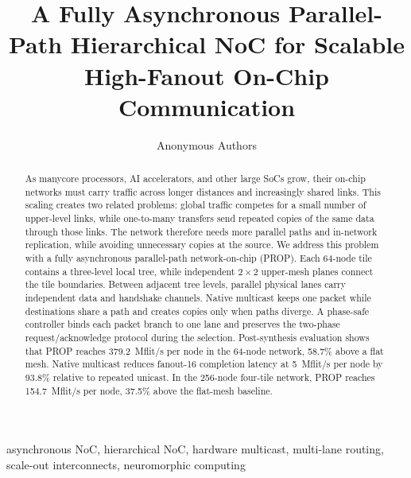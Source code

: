 \documentclass[conference]{IEEEtran}
\begin{document}
\setlength{\textfloatsep}{8pt}
\setlength{\dbltextfloatsep}{8pt}
\setlength{\floatsep}{6pt}
\setlength{\dblfloatsep}{6pt}

\title{A Fully Asynchronous Parallel-Path Hierarchical NoC for Scalable High-Fanout On-Chip Communication}

\author{Anonymous Authors}

\maketitle
\vspace{-3em}

\begin{abstract}
As manycore processors, AI accelerators, and other large SoCs grow, their on-chip networks must carry traffic across longer distances and increasingly shared links. This scaling creates two related problems: global traffic competes for a small number of upper-level links, while one-to-many transfers send repeated copies of the same data through those links. The network therefore needs more parallel paths and in-network replication, while avoiding unnecessary copies at the source. We address this problem with a fully asynchronous parallel-path network-on-chip (PROP). Each 64-node tile contains a three-level local tree, while independent $2\times2$ upper-mesh planes connect the tile boundaries. Between adjacent tree levels, parallel physical lanes carry independent data and handshake channels. Native multicast keeps one packet while destinations share a path and creates copies only when paths diverge. A phase-safe controller binds each packet branch to one lane and preserves the two-phase request/acknowledge protocol during the selection. Post-synthesis evaluation shows that PROP reaches 379.2~Mflit/s per node in the 64-node network, 58.7\% above a flat mesh. Native multicast reduces fanout-16 completion latency at 5~Mflit/s per node by 93.8\% relative to repeated unicast. In the 256-node four-tile network, PROP reaches 154.7~Mflit/s per node, 37.5\% above the flat-mesh baseline.
\end{abstract}

\begin{IEEEkeywords}
asynchronous NoC, hierarchical NoC, hardware multicast, multi-lane routing, scale-out interconnects, neuromorphic computing
\end{IEEEkeywords}
\end{document}

